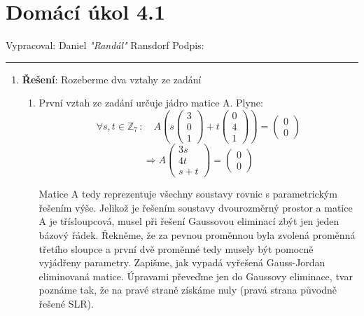 \documentclass[12pt]{article}
\begin{document}
\section*{Domácí úkol 4.1}

Vypracoval: Daniel \textit{"Randál"} Ransdorf \hfill Podpis: \rule{4cm}{0.4pt}

\begin{enumerate}
  \item \textbf{Řešení}:
    Rozeberme dva vztahy ze zadání
    \begin{enumerate}
    \item
    První vztah ze zadání určuje jádro matice A. Plyne:
    \[
      \forall s,t \in \mathbb{Z}_7 \,: \quad
      A
      \left(
      s\left(\begin{array}{c}
      3 \\ 0 \\ 1
      \end{array}\right) +
      t\left(\begin{array}{c}
      0 \\ 4 \\ 1
      \end{array}\right)
      \right)
      = 
      \left(\begin{array}{c}
      0 \\ 0
      \end{array}\right)
    \]
    \[
      \Longrightarrow
      A
      \left(\begin{array}{c}
      3s \\ 4t \\ s + t
      \end{array}\right)
      = 
      \left(\begin{array}{c}
      0 \\ 0
      \end{array}\right)
    \]

    Matice A tedy reprezentuje všechny soustavy rovnic s parametrickým řešením výše.
    Jelikož je řešením soustavy dvourozměrný prostor a matice A je třísloupcová,
    musel při řešení Gaussovou eliminací zbýt jen jeden bázový řádek.
    Řekněme, že za pevnou proměnnou byla zvolená proměnná třetího sloupce a první dvě proměnné tedy musely
    být pomocně vyjádřeny parametry. Zapišme, jak vypadá vyřešená Gauss-Jordan eliminovaná matice.
    Úpravami převeďme jen do Gaussovy eliminace,
    tvar poznáme tak, že na pravé straně získáme nuly (pravá strana původně řešené SLR).


\end{enumerate}
\end{enumerate}
\end{document}
